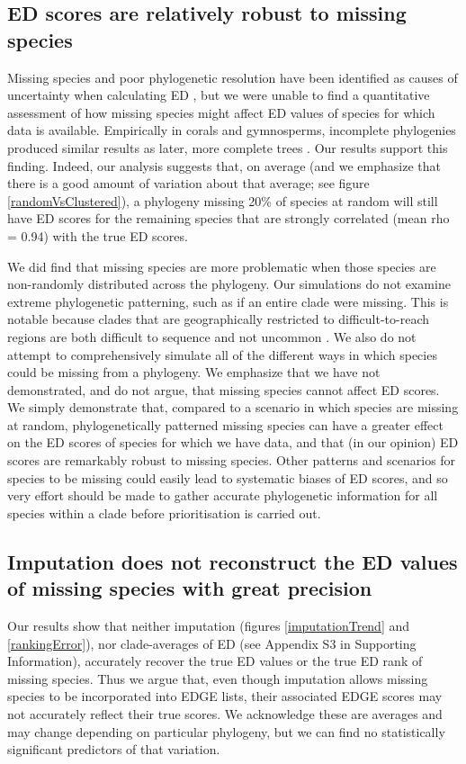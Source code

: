 \documentclass[10pt,english]{article}
\begin{document}
\subsection*{ED scores are relatively robust to missing species}
Missing species and poor phylogenetic resolution have been identified as causes
of uncertainty when calculating ED \autocite{Isaac2007}, but we were unable to
find a quantitative assessment of how missing species might affect ED values of
species for which data is available. Empirically in corals and gymnosperms,
incomplete phylogenies produced similar results as later, more complete trees
\autocite{Curnick2015, Forest2018}. Our results support this finding. Indeed,
our analysis suggests that, on average (and we emphasize that there is a good
amount of variation about that average; see figure \ref{randomVsClustered}), a
phylogeny missing 20\% of species at random will still have ED scores for the
remaining species that are strongly correlated (mean rho = 0.94) with the true
ED scores.

We did find that missing species are more problematic when those species are
non-randomly distributed across the phylogeny. Our simulations do not examine
extreme phylogenetic patterning, such as if an entire clade were missing. This
is notable because clades that are geographically restricted to
difficult-to-reach regions are both difficult to sequence and not uncommon
\autocite[as is seen with 27 coral species in the Indian
Ocean;][]{Arrigoni2012}. We also do not attempt to comprehensively simulate all
of the different ways in which species could be missing from a phylogeny. We
emphasize that we have not demonstrated, and do not argue, that missing species
cannot affect ED scores. We simply demonstrate that, compared to a scenario in
which species are missing at random, phylogenetically patterned missing species
can have a greater effect on the ED scores of species for which we have data,
and that (in our opinion) ED scores are remarkably robust to missing species.
Other patterns and scenarios for species to be missing could easily lead to
systematic biases of ED scores, and so very effort should be made to gather
accurate phylogenetic information for all species within a clade before
prioritisation is carried out.

\subsection*{Imputation does not reconstruct the ED values of missing species with great precision}
Our results show that neither imputation (figures \ref{imputationTrend} and
\ref{rankingError}), nor clade-averages of ED (see Appendix S3 in Supporting
Information), accurately recover the true ED values or the true ED rank of
missing species. Thus we argue that, even though imputation allows missing
species to be incorporated into EDGE lists, their associated EDGE scores may not
accurately reflect their true scores. We acknowledge these are averages and may
change depending on particular phylogeny, but we can find no statistically
significant predictors of that variation.
\end{document}
